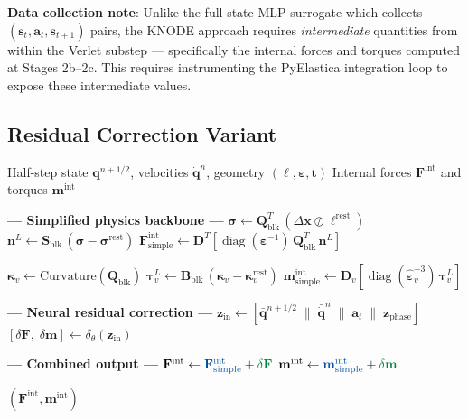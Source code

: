 \documentclass[11pt]{article}
\newcommand{\vect}[1]{\mathbf{#1}}
\newcommand{\mat}[1]{\mathbf{#1}}
\newcommand{\Real}{\mathbb{R}}
\newcommand{\phys}[1]{{\color{physicsblue}#1}}
\newcommand{\nn}[1]{{\color{nngreen}#1}}
\begin{document}
\noindent
\textbf{Data collection note}: Unlike the full-state MLP surrogate which collects $(\vect{s}_t, \vect{a}_t, \vect{s}_{t+1})$ pairs, the KNODE approach requires \emph{intermediate} quantities from within the Verlet substep --- specifically the internal forces and torques computed at Stages 2b--2c.
This requires instrumenting the PyElastica integration loop to expose these intermediate values.


\subsection{Residual Correction Variant}

\begin{algorithm}[H]
\caption{Simplified-Physics + Residual Correction}
\label{alg:residual}
\begin{algorithmic}[1]
\Require Half-step state $\vect{q}^{n+1/2}$, velocities $\dot{\vect{q}}^n$, geometry $(\bm{\ell}, \bm{\varepsilon}, \vect{t})$
\Ensure Internal forces $\vect{F}^{\text{int}}$ and torques $\vect{m}^{\text{int}}$

\Statex \textcolor{physicsblue}{\textbf{--- Simplified physics backbone ---}}
\State $\bm{\sigma} \gets \mat{Q}^T_{\text{blk}}\,(\Delta\vect{x} \oslash \bm{\ell}^{\text{rest}})$ 
\State $\vect{n}^L \gets \mat{S}_{\text{blk}}\,(\bm{\sigma} - \bm{\sigma}^{\text{rest}})$ 
\State $\vect{F}^{\text{int}}_{\text{simple}} \gets \mat{D}^T[\operatorname{diag}(\bm{\varepsilon}^{-1})\,\mat{Q}^T_{\text{blk}}\,\vect{n}^L]$

\Statex
\State $\bm{\kappa}_v \gets \text{Curvature}(\mat{Q}_{\text{blk}})$ 
\State $\bm{\tau}^L_v \gets \mat{B}_{\text{blk}}\,(\bm{\kappa}_v - \bm{\kappa}^{\text{rest}}_v)$ 
\State $\vect{m}^{\text{int}}_{\text{simple}} \gets \mat{D}_v[\operatorname{diag}(\hat{\bm{\varepsilon}}^{-3}_v)\,\bm{\tau}^L_v]$

\Statex
\Statex \textcolor{nngreen}{\textbf{--- Neural residual correction ---}}
\State $\vect{z}_{\text{in}} \gets [\bar{\vect{q}}^{n+1/2} \;\|\; \bar{\dot{\vect{q}}}^n \;\|\; \vect{a}_t \;\|\; \vect{z}_{\text{phase}}]$
\State $[\delta\vect{F},\; \delta\vect{m}] \gets \delta_\theta(\vect{z}_{\text{in}})$ \Comment{$\Real^{131} \to \Real^{62}$}

\Statex
\Statex \textcolor{hybrid}{\textbf{--- Combined output ---}}
\State $\vect{F}^{\text{int}} \gets \phys{\vect{F}^{\text{int}}_{\text{simple}}} + \nn{\delta\vect{F}}$
\State $\vect{m}^{\text{int}} \gets \phys{\vect{m}^{\text{int}}_{\text{simple}}} + \nn{\delta\vect{m}}$

\State \Return $(\vect{F}^{\text{int}}, \vect{m}^{\text{int}})$
\end{algorithmic}
\end{algorithm}
\end{document}
